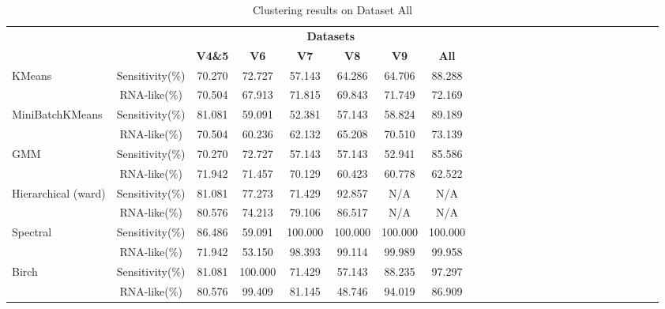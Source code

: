 
\begin{table}[ht!]
    \centering
    \setlength\tabcolsep{4pt}
    \captionsetup{margin=0.5cm}
    \caption{Clustering results on Dataset All}
    \label{tab:prior_metrics}
    \begin{tabular}{lcccccccccccccccccccccccc}
        \toprule
        & & \multicolumn{6}{c}{\textbf{Datasets}} \\
        \cmidrule(lr){3-8}
        && \textbf{V4\&5} & \textbf{V6} & \textbf{V7} & \textbf{V8} & \textbf{V9} & \textbf{All} \\
        \midrule
        KMeans & Sensitivity(\%) & 70.270 & 72.727 & 57.143 & 64.286 & 64.706 & 88.288 \\
                  & RNA-like(\%) & 70.504 & 67.913 & 71.815 & 69.843 & 71.749 & 72.169 \\
        MiniBatchKMeans & Sensitivity(\%) & 81.081 & 59.091 & 52.381 & 57.143 & 58.824 & 89.189 \\
                  & RNA-like(\%) & 70.504 & 60.236 & 62.132 & 65.208 & 70.510 & 73.139 \\
        GMM & Sensitivity(\%) & 70.270 & 72.727 & 57.143 & 57.143 & 52.941 & 85.586 \\
                  & RNA-like(\%) & 71.942 & 71.457 & 70.129 & 60.423 & 60.778 & 62.522 \\
        Hierarchical (ward) & Sensitivity(\%) & 81.081 & 77.273 & 71.429 & 92.857 & N/A & N/A \\
                  & RNA-like(\%) & 80.576 & 74.213 & 79.106 & 86.517 & N/A & N/A \\
        Spectral & Sensitivity(\%) & 86.486 & 59.091 & 100.000 & 100.000 & 100.000 & 100.000 \\
                  & RNA-like(\%) & 71.942 & 53.150 & 98.393 & 99.114 & 99.989 & 99.958 \\
        Birch & Sensitivity(\%) & 81.081 & 100.000 & 71.429 & 57.143 & 88.235 & 97.297 \\
                  & RNA-like(\%) & 80.576 & 99.409 & 81.145 & 48.746 & 94.019 & 86.909 \\
        \bottomrule
    \end{tabular}
\end{table}
